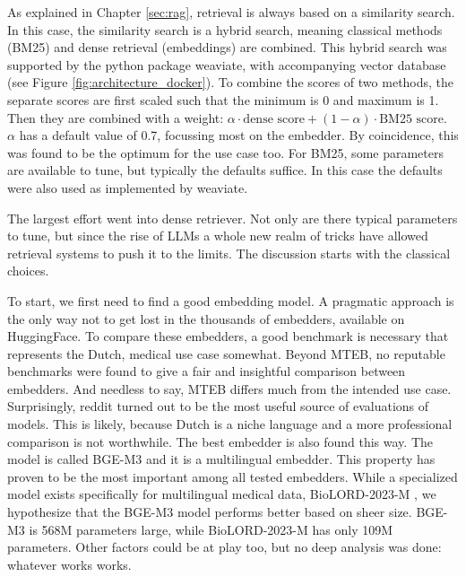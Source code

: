 As explained in Chapter \ref{sec:rag}, retrieval is always based on a similarity search. In this case, the similarity search is a hybrid search, meaning classical methods (BM25) and dense retrieval (embeddings) are combined. This hybrid search was supported by the python package weaviate, with accompanying vector database (see Figure \ref{fig:architecture_docker}). To combine the scores of two methods, the separate scores are first scaled such that the minimum is 0 and maximum is 1. Then they are combined with a weight: $\alpha \cdot \text{dense score} + (1-\alpha) \cdot \text{BM25 score}$. $\alpha$ has a default value of 0.7, focussing most on the embedder. By coincidence, this was found to be the optimum for the use case too. For BM25, some parameters are available to tune, but typically the defaults suffice. In this case the defaults were also used as implemented by weaviate.

The largest effort went into dense retriever. Not only are there typical parameters to tune, but since the rise of LLMs a whole new realm of tricks have allowed retrieval systems to push it to the limits. The discussion starts with the classical choices.

To start, we first need to find a good embedding model. A pragmatic approach is the only way not to get lost in the thousands of embedders, available on HuggingFace. To compare these embedders, a good benchmark is necessary that represents the Dutch, medical use case somewhat. Beyond MTEB, no reputable benchmarks were found to give a fair and insightful comparison between embedders. And needless to say, MTEB differs much from the intended use case. Surprisingly, reddit \cite{reddit2025embedding} turned out to be the most useful source of evaluations of models. This is likely, because Dutch is a niche language and a more professional comparison is not worthwhile. The best embedder is also found this way. The model is called BGE-M3 and it is a multilingual embedder. This property has proven to be the most important among all tested embedders. While a specialized model exists specifically for multilingual medical data, BioLORD-2023-M \cite{remy2024biolord}, we hypothesize that the BGE-M3 model performs better based on sheer size. BGE-M3 is 568M parameters large, while BioLORD-2023-M has only 109M parameters. Other factors could be at play too, but no deep analysis was done: whatever works works.

